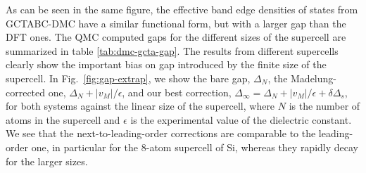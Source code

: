 As can be seen in the same figure, the effective band edge densities of states from GCTABC-DMC
have a similar functional form, but with a larger gap than the DFT ones.
The QMC computed gaps
for the different sizes of the supercell are summarized in table \ref{tab:dmc-gcta-gap}.
The results from different supercells clearly show the important bias 
on gap introduced by the finite size of the supercell. In Fig.~\ref{fig:gap-extrap}, we show the bare gap, $\Delta_N$, the Madelung-corrected one, $\Delta_N+|v_M|/\epsilon$, and our best correction, $\Delta_\infty=\Delta_N+|v_M|/\epsilon+\delta \Delta_s$, for both systems against the linear size of the supercell, where $N$ is the number of atoms in the supercell and $\epsilon$ is the experimental value of the dielectric constant.
We see that the next-to-leading-order corrections are 
comparable to the leading-order one, in particular for the 8-atom supercell of Si,
whereas they rapidly decay for the larger sizes. 

